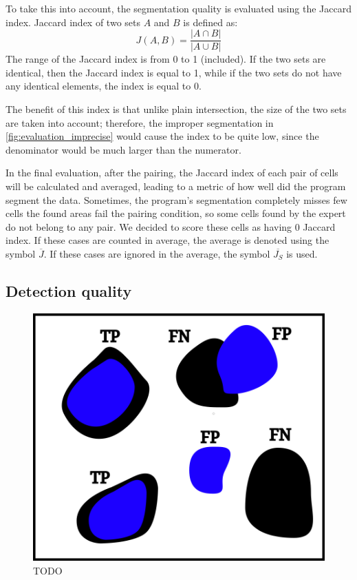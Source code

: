\documentclass[
  digital,     %
  oneside,     %
  nosansbold,  %
  nocolorbold, %
  lof,         %
  lot,         %
]{fithesis4}
\begin{document}
To take this into account, the segmentation quality is evaluated using the
Jaccard index. Jaccard index of two sets $A$ and $B$ is defined
as\cite{2020eelbode}:
$$J(A, B) = \frac{|A \cap B|}{|A \cup B|}$$
The range of the Jaccard index is from 0 to 1 (included). If the two sets are
identical, then the Jaccard index is equal to 1, while if the two sets do not
have any identical elements, the index is equal to 0.

The benefit of this index is that unlike plain intersection, the size of the two
sets are taken into account; therefore, the improper segmentation in
\ref{fig:evaluation_imprecise} would cause the index to be quite low, since the
denominator would be much larger than the numerator.

In the final evaluation, after the pairing, the Jaccard index of each pair of
cells will be calculated and averaged, leading to a metric of how well did the
program segment the data. Sometimes, the program's segmentation completely
misses few cells the found areas fail the pairing condition, so some cells found
by the expert do not belong to any pair. We decided to score these cells as
having 0 Jaccard index. If these cases are counted in average, the average is
denoted using the symbol $\overline{J}$. If these cases are ignored in the
average, the symbol $\overline{J_S}$ is used.


\subsection{Detection quality}
\begin{figure}
    \begin{center}
        \includegraphics{resources/inkscape/evaluation_with_TP.png}
    \end{center}
    \caption{TODO}
    \label{fig:evaluation_with_TP}
\end{figure}
\end{document}
